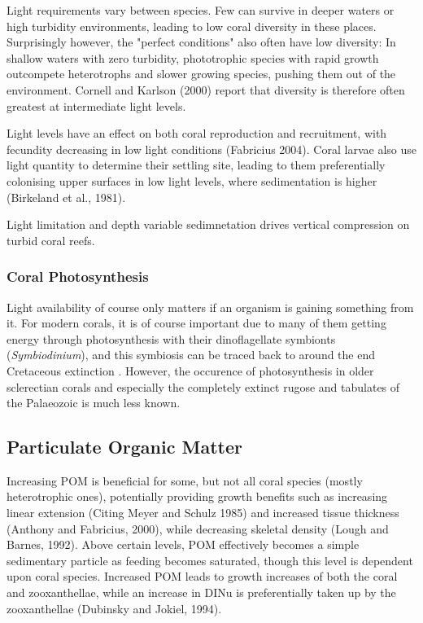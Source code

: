 \documentclass[11pt,a4paper]{article}
\begin{document}
Light requirements vary between species. Few can survive in deeper waters or high turbidity environments, leading to low coral diversity in these places. Surprisingly however, the "perfect conditions" also often have low diversity: In shallow waters with zero turbidity, phototrophic species with rapid growth outcompete heterotrophs and slower growing species, pushing them out of the environment. Cornell and Karlson (2000) report that diversity is therefore often greatest at intermediate light levels. 

Light levels have an effect on both coral reproduction and recruitment, with fecundity decreasing in low light conditions (Fabricius 2004). Coral larvae also use light quantity to determine their settling site, leading to them preferentially colonising upper surfaces in low light levels, where sedimentation is higher (Birkeland et al., 1981). 

\cite{Morgan2020} Light limitation and depth variable sedimnetation drives vertical compression on turbid coral reefs.

\subsubsection{Coral Photosynthesis}

Light availability of course only matters if an organism is gaining something from it. For modern corals, it is of course important due to many of them getting energy through photosynthesis with their dinoflagellate symbionts (\textit{Symbiodinium}), and this symbiosis can be traced back to around the end Cretaceous extinction \citep{Lipps2016photosynthesis}. However, the occurence of photosynthesis in older sclerectian corals and especially the completely extinct rugose and tabulates of the Palaeozoic is much less known. 

\subsection{Particulate Organic Matter}

Increasing POM is beneficial for some, but not all coral species (mostly heterotrophic ones), potentially providing growth benefits such as increasing linear extension (Citing Meyer and Schulz 1985) and increased tissue thickness (Anthony and Fabricius, 2000), while decreasing skeletal density (Lough and Barnes, 1992). Above certain levels, POM effectively becomes a simple sedimentary particle as feeding becomes saturated, though this level is dependent upon coral species. Increased POM leads to growth increases of both the coral and zooxanthellae, while an increase in DINu is preferentially taken up by the zooxanthellae (Dubinsky and Jokiel, 1994).
\end{document}
